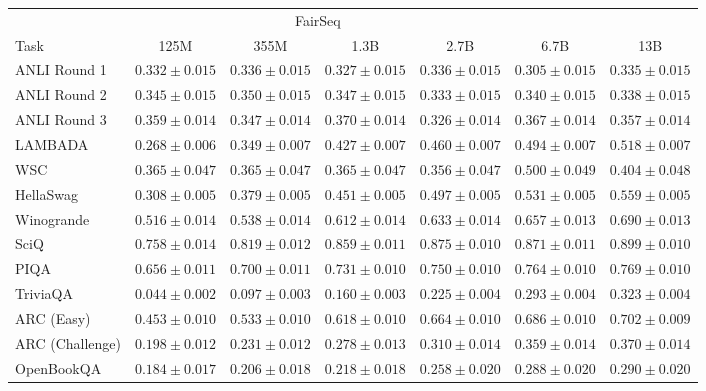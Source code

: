 \documentclass[11pt]{article}
\begin{document}
{\begin{landscape}
\begin{table}
\centering %
\begin{tabular}{l c c c c c c } \\ 
& \multicolumn{4}{c}{FairSeq} \\ 
Task & 125M & 355M & 1.3B & 2.7B & 6.7B & 13B \\ \toprule
ANLI Round 1 & $0.332 \pm 0.015$ & $0.336 \pm 0.015$ & $0.327 \pm 0.015$ & $0.336 \pm 0.015$ & $0.305 \pm 0.015$ & $0.335 \pm 0.015$ \\ 
ANLI Round 2 & $0.345 \pm 0.015$ & $0.350 \pm 0.015$ & $0.347 \pm 0.015$ & $0.333 \pm 0.015$ & $0.340 \pm 0.015$ & $0.338 \pm 0.015$ \\ 
ANLI Round 3 & $0.359 \pm 0.014$ & $0.347 \pm 0.014$ & $0.370 \pm 0.014$ & $0.326 \pm 0.014$ & $0.367 \pm 0.014$ & $0.357 \pm 0.014$ \\ 
LAMBADA & $0.268 \pm 0.006$ & $0.349 \pm 0.007$ & $0.427 \pm 0.007$ & $0.460 \pm 0.007$ & $0.494 \pm 0.007$ & $0.518 \pm 0.007$ \\ 
WSC & $0.365 \pm 0.047$ & $0.365 \pm 0.047$ & $0.365 \pm 0.047$ & $0.356 \pm 0.047$ & $0.500 \pm 0.049$ & $0.404 \pm 0.048$ \\ 
HellaSwag & $0.308 \pm 0.005$ & $0.379 \pm 0.005$ & $0.451 \pm 0.005$ & $0.497 \pm 0.005$ & $0.531 \pm 0.005$ & $0.559 \pm 0.005$ \\ 
Winogrande & $0.516 \pm 0.014$ & $0.538 \pm 0.014$ & $0.612 \pm 0.014$ & $0.633 \pm 0.014$ & $0.657 \pm 0.013$ & $0.690 \pm 0.013$ \\ 
SciQ & $0.758 \pm 0.014$ & $0.819 \pm 0.012$ & $0.859 \pm 0.011$ & $0.875 \pm 0.010$ & $0.871 \pm 0.011$ & $0.899 \pm 0.010$ \\ 
PIQA & $0.656 \pm 0.011$ & $0.700 \pm 0.011$ & $0.731 \pm 0.010$ & $0.750 \pm 0.010$ & $0.764 \pm 0.010$ & $0.769 \pm 0.010$ \\ 
TriviaQA & $0.044 \pm 0.002$ & $0.097 \pm 0.003$ & $0.160 \pm 0.003$ & $0.225 \pm 0.004$ & $0.293 \pm 0.004$ & $0.323 \pm 0.004$ \\ 
ARC (Easy) & $0.453 \pm 0.010$ & $0.533 \pm 0.010$ & $0.618 \pm 0.010$ & $0.664 \pm 0.010$ & $0.686 \pm 0.010$ & $0.702 \pm 0.009$ \\ 
ARC (Challenge) & $0.198 \pm 0.012$ & $0.231 \pm 0.012$ & $0.278 \pm 0.013$ & $0.310 \pm 0.014$ & $0.359 \pm 0.014$ & $0.370 \pm 0.014$ \\ 
OpenBookQA & $0.184 \pm 0.017$ & $0.206 \pm 0.018$ & $0.218 \pm 0.018$ & $0.258 \pm 0.020$ & $0.288 \pm 0.020$ & $0.290 \pm 0.020$ \\ 

\end{tabular}
\end{table}
\end{landscape}}
\end{document}
